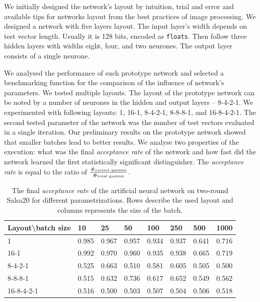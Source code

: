 \documentclass[
  print, %
  Table,   %
  nolof,     %
  nolot,     %
  11pt, %
  oneside  %
]{fithesis3}
\begin{document}
We initially designed the network's layout by intuition, trial and error and available tips for networks layout from the best practices of image processing. We designed a network with five layers layout. The input layer's width depends on test vector length. Usually it is 128 bits, encoded as \texttt{floats}. Then follow three hidden layers with widths eight, four, and two neurones. The output layer consists of a single neurone.

We analysed the performance of such prototype network and selected a benchmarking function for the comparison of the influence of network's parameters. We tested multiple layouts. The layout of the prototype network can be noted by a number of neurones in the hidden and output layers -- 8-4-2-1. We experimented with following layouts: 1, 16-1, 8-4-2-1, 8-8-8-1, and 16-8-4-2-1. The second tested parameter of the network was the number of test vectors evaluated in a single iteration. Our preliminary results on the prototype network showed that smaller batches lead to better results. We analyse two properties of the execution: what was the final \textit{acceptance rate} of the network and how fast did the network learned the first statistically significant distinguisher. The \textit{acceptance rate} is equal to the ratio of $\frac{\#_{\textnormal{correct guesses}}}{\#_{\textnormal{total guesses}}}$.

\begin{table}[b]
\centering
\begin{tabular}{l|l l l l l l l}
Layout\textbackslash{}batch size & 10 & 25 & 50 & 100 & 250 & 500 & 1000\\ \hline
1          & 0.985 & 0.967 & 0.957 & 0.934 & 0.937 & 0.641 & 0.716 \\
16-1       & 0.992 & 0.970 & 0.960 & 0.935 & 0.938 & 0.665 & 0.719 \\
8-4-2-1    & 0.525 & 0.663 & 0.510 & 0.581 & 0.605 & 0.505 & 0.500 \\
8-8-8-1    & 0.515 & 0.632 & 0.736 & 0.617 & 0.652 & 0.549 & 0.562 \\
16-8-4-2-1 & 0.516 & 0.500 & 0.503 & 0.507 & 0.504 & 0.506 & 0.518  
\end{tabular}
\caption{The final \textit{acceptance rate} of the artificial neural network on two-round Salsa20 for different parametrizations. Rows describe the used layout and columns represents the size of the batch.}
\label{table:res-ann-acc}
\end{table}
\end{document}
